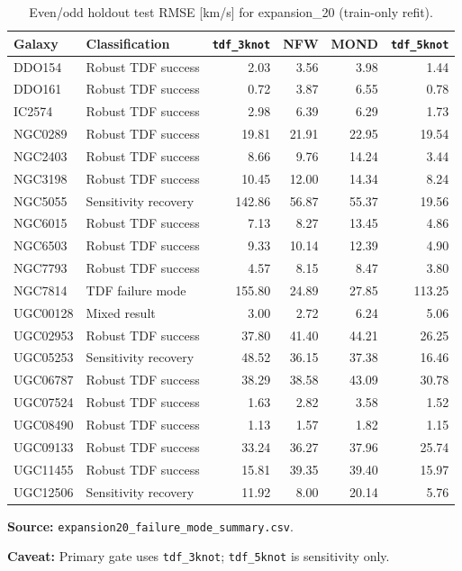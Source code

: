 \begin{table}[htbp]
\centering
\caption{Even/odd holdout test RMSE [km/s] for expansion\_20 (train-only refit).}
\label{tab:holdout-rmse}
\scriptsize
\begin{tabular}{@{}l l r r r r@{}}
\toprule
Galaxy & Classification & \texttt{tdf\_3knot} & NFW & MOND & \texttt{tdf\_5knot} \\
\midrule
DDO154 & Robust TDF success & 2.03 & 3.56 & 3.98 & 1.44 \\
DDO161 & Robust TDF success & 0.72 & 3.87 & 6.55 & 0.78 \\
IC2574 & Robust TDF success & 2.98 & 6.39 & 6.29 & 1.73 \\
NGC0289 & Robust TDF success & 19.81 & 21.91 & 22.95 & 19.54 \\
NGC2403 & Robust TDF success & 8.66 & 9.76 & 14.24 & 3.44 \\
NGC3198 & Robust TDF success & 10.45 & 12.00 & 14.34 & 8.24 \\
NGC5055 & Sensitivity recovery & 142.86 & 56.87 & 55.37 & 19.56 \\
NGC6015 & Robust TDF success & 7.13 & 8.27 & 13.45 & 4.86 \\
NGC6503 & Robust TDF success & 9.33 & 10.14 & 12.39 & 4.90 \\
NGC7793 & Robust TDF success & 4.57 & 8.15 & 8.47 & 3.80 \\
NGC7814 & TDF failure mode & 155.80 & 24.89 & 27.85 & 113.25 \\
UGC00128 & Mixed result & 3.00 & 2.72 & 6.24 & 5.06 \\
UGC02953 & Robust TDF success & 37.80 & 41.40 & 44.21 & 26.25 \\
UGC05253 & Sensitivity recovery & 48.52 & 36.15 & 37.38 & 16.46 \\
UGC06787 & Robust TDF success & 38.29 & 38.58 & 43.09 & 30.78 \\
UGC07524 & Robust TDF success & 1.63 & 2.82 & 3.58 & 1.52 \\
UGC08490 & Robust TDF success & 1.13 & 1.57 & 1.82 & 1.15 \\
UGC09133 & Robust TDF success & 33.24 & 36.27 & 37.96 & 25.74 \\
UGC11455 & Robust TDF success & 15.81 & 39.35 & 39.40 & 15.97 \\
UGC12506 & Sensitivity recovery & 11.92 & 8.00 & 20.14 & 5.76 \\
\bottomrule
\end{tabular}
\vspace{0.4em}
{\footnotesize
\par\noindent\textbf{Source:} \texttt{expansion20\_failure\_mode\_summary.csv}.
\par\noindent\textbf{Caveat:} Primary gate uses \texttt{tdf\_3knot}; \texttt{tdf\_5knot} is sensitivity only.
\par
}
\end{table}
